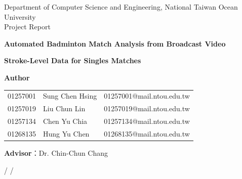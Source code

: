 \begin{center}
\vspace*{1cm}

{\fontsize{12}{18}\selectfont Department of Computer Science and Engineering, National Taiwan Ocean University\\Project Report}\par

\vspace*{3.5cm}

{\Huge\textbf{Automated Badminton Match Analysis from Broadcast Video}}\par
{\Large\textbf{Stroke-Level Data for Singles Matches}}\par

\vspace*{3cm}

\textbf{Author}\par
\begin{tabular}{lll}
01257001 & Sung Chen Hsing & 01257001@mail.ntou.edu.tw \\
01257019 & Liu Chun Lin & 01257019@mail.ntou.edu.tw \\
01257134 & Chen Yu Chia & 01257134@mail.ntou.edu.tw \\
01268135 & Hung Yu Chen & 01268135@mail.ntou.edu.tw
\end{tabular}\par

\vspace*{1.5cm}

{\fontsize{16}{24}\selectfont \textbf{Advisor}：Dr. Chin-Chun Chang}\par

\vspace*{2cm}

{\fontsize{12}{18}/\,\,/\,\,}\par
\end{center}

\clearpage

